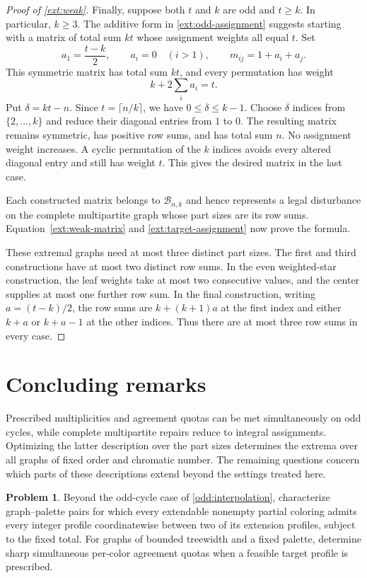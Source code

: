 \documentclass[11pt,reqno]{amsart}
\numberwithin{equation}{section}
\theoremstyle{definition}
\newtheorem{problem}[theorem]{Problem}
\theoremstyle{remark}
\begin{document}
\begin{proof}[Proof of \cref{ext:weak}]
Finally, suppose both $t$ and $k$ are odd and $t\ge k$. In
particular, $k\ge3$. The additive form in
\cref{ext:odd-assignment} suggests starting with a matrix of total
sum $kt$ whose assignment weights all equal $t$. Set
\[
 a_1=\frac{t-k}{2},\qquad a_i=0\quad(i>1),
 \qquad m_{ij}=1+a_i+a_j.
\]
This symmetric matrix has total sum $kt$, and every permutation has
weight
\[
 k+2\sum_i a_i=t.
\]
Put $\delta=kt-n$.  Since $t=\lceil n/k\rceil$, we have
$0\le\delta\le k-1$.  Choose $\delta$ indices from
$\{2,\ldots,k\}$ and reduce their diagonal entries from $1$ to $0$.
The resulting matrix remains symmetric, has positive row sums, and
has total sum $n$.  No assignment weight increases.  A cyclic
permutation of the $k$ indices avoids every altered diagonal entry
and still has weight $t$.  This gives the desired matrix in the last
case.

Each constructed matrix belongs to $\mathcal B_{n,k}$ and hence
represents a legal disturbance on the complete multipartite graph
whose part sizes are its row sums.  Equation~\eqref{ext:weak-matrix}
and \eqref{ext:target-assignment} now prove the formula.

These extremal graphs need at most three distinct part sizes.
The first and third constructions have at most two distinct row sums.
In the even weighted-star construction, the leaf weights take at most
two consecutive values, and the center supplies at most one further
row sum. In the final construction, writing $a=(t-k)/2$, the row sums
are $k+(k+1)a$ at the first index and either $k+a$ or $k+a-1$ at the
other indices. Thus there are at most three row sums in every case.
\end{proof}

\section{Concluding remarks}\label{sec:questions}

Prescribed multiplicities and agreement quotas can be met simultaneously
on odd cycles, while complete multipartite repairs reduce to integral
assignments. Optimizing the latter description over the part sizes
determines the extrema over all graphs of fixed order and chromatic
number. The remaining questions concern which parts of these
descriptions extend beyond the settings treated here.

\begin{problem}\label{problem:profile-interpolation}
Beyond the odd-cycle case of \cref{odd:interpolation}, characterize
graph--palette pairs for which every extendable nonempty
partial coloring admits every integer profile coordinatewise between
two of its extension profiles, subject to the fixed total.
For graphs of bounded treewidth and a fixed palette, determine sharp
simultaneous per-color agreement quotas when a feasible target profile
is prescribed.
\end{problem}
\end{document}
